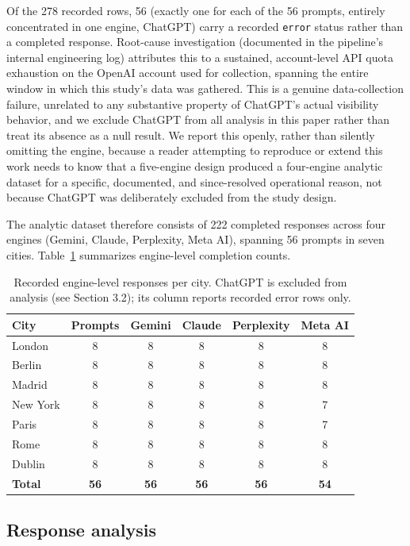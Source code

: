 \documentclass[11pt]{article}
\begin{document}
Of the 278 recorded rows, 56 (exactly one for each of the 56 prompts, entirely
concentrated in one engine, ChatGPT) carry a recorded \texttt{error} status rather than
a completed response. Root-cause investigation (documented in the pipeline's internal
engineering log) attributes this to a sustained, account-level API quota exhaustion on
the OpenAI account used for collection, spanning the entire window in which this study's
data was gathered. This is a genuine data-collection failure, unrelated to any
substantive property of ChatGPT's actual visibility behavior, and we exclude ChatGPT
from all analysis in this paper rather than treat its absence as a null result. We
report this openly, rather than silently omitting the engine, because a reader
attempting to reproduce or extend this work needs to know that a five-engine design
produced a four-engine analytic dataset for a specific, documented, and since-resolved
operational reason, not because ChatGPT was deliberately excluded from the study design.

The analytic dataset therefore consists of 222 completed responses across four engines
(Gemini, Claude, Perplexity, Meta AI), spanning 56 prompts in seven cities.
Table~\ref{tab:dataset} summarizes engine-level completion counts.

\begin{table}[h]
\centering
\caption{Recorded engine-level responses per city. ChatGPT is excluded from analysis
(see Section 3.2); its column reports recorded error rows only.}
\label{tab:dataset}
\begin{tabular}{lccccc}
\toprule
City & Prompts & Gemini & Claude & Perplexity & Meta AI \\
\midrule
London & 8 & 8 & 8 & 8 & 8 \\
Berlin & 8 & 8 & 8 & 8 & 8 \\
Madrid & 8 & 8 & 8 & 8 & 8 \\
New York & 8 & 8 & 8 & 8 & 7 \\
Paris & 8 & 8 & 8 & 8 & 7 \\
Rome & 8 & 8 & 8 & 8 & 8 \\
Dublin & 8 & 8 & 8 & 8 & 8 \\
\midrule
\textbf{Total} & \textbf{56} & \textbf{56} & \textbf{56} & \textbf{56} & \textbf{54} \\
\bottomrule
\end{tabular}
\end{table}

\subsection{Response analysis}
\end{document}
